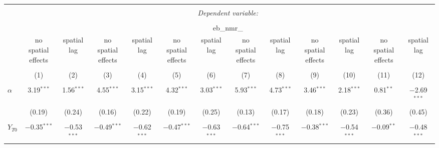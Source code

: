
\begin{sidewaystable}[!htbp] \centering 
  \caption{} 
  \label{} 
\begin{tabular}{@{\extracolsep{0.1pt}}lcccccccccccc} 
\\[-1.8ex]\hline 
\hline \\[-1.8ex] 
 & \multicolumn{12}{c}{\textit{Dependent variable:}} \\ 
\cline{2-13} 
\\[-1.8ex] & \multicolumn{12}{c}{eb\_nmr\_} \\ 
 & \shortstack{no spatial \\ effects} & \shortstack{spatial\\  lag} & \shortstack{no spatial \\ effects} & \shortstack{spatial\\  lag} & \shortstack{no spatial \\ effects} & \shortstack{spatial\\  lag} & \shortstack{no spatial \\ effects} & \shortstack{spatial\\  lag} & \shortstack{no spatial \\ effects} & \shortstack{spatial\\  lag} & \shortstack{no spatial \\ effects} & \shortstack{spatial\\  lag} \\ 
\\[-1.8ex] & (1) & (2) & (3) & (4) & (5) & (6) & (7) & (8) & (9) & (10) & (11) & (12)\\ 
\hline \\[-1.8ex] 
 $\alpha$ & 3.19$^{***}$ & 1.56$^{***}$ & 4.55$^{***}$ & 3.15$^{***}$ & 4.32$^{***}$ & 3.03$^{***}$ & 5.93$^{***}$ & 4.73$^{***}$ & 3.46$^{***}$ & 2.18$^{***}$ & 0.81$^{**}$ & $-$2.69$^{***}$ \\ 
  & (0.19) & (0.24) & (0.16) & (0.22) & (0.19) & (0.25) & (0.13) & (0.17) & (0.18) & (0.23) & (0.36) & (0.45) \\ 
  & & & & & & & & & & & & \\ 
 $Y_{T0}$ & $-$0.35$^{***}$ & $-$0.53$^{***}$ & $-$0.49$^{***}$ & $-$0.62$^{***}$ & $-$0.47$^{***}$ & $-$0.63$^{***}$ & $-$0.64$^{***}$ & $-$0.75$^{***}$ & $-$0.38$^{***}$ & $-$0.54$^{***}$ & $-$0.09$^{**}$ & $-$0.48$^{***}$ \\ 

\end{tabular}
\end{sidewaystable}

